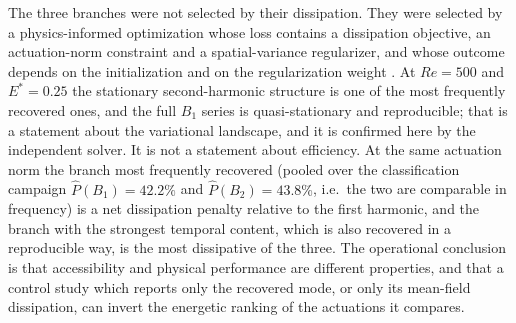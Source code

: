 \documentclass[11pt,a4paper]{article}
\newenvironment{chgadd}{\par\color{blue}}{\par\color{black}}
\begin{document}
\begin{chgadd}
The three branches were not selected by their dissipation. They were selected by a
physics-informed optimization whose loss contains a dissipation objective, an
actuation-norm constraint and a spatial-variance regularizer, and whose outcome
depends on the initialization and on the regularization weight
\cite{beniaiche2026}. At $Re=500$ and $E^\ast=0.25$ the stationary
second-harmonic structure is one of the most frequently recovered ones, and the full
$B_1$ series is quasi-stationary and reproducible; that is a statement about the
variational landscape, and it is confirmed here by the independent solver. It is
not a statement about efficiency. At the same actuation norm the branch most
frequently recovered (pooled over the classification campaign
$\widehat{P}(B_1)=42.2\%$ and $\widehat{P}(B_2)=43.8\%$, i.e.\ the two are
comparable in frequency) is a net dissipation penalty relative to the first harmonic,
and the branch with the strongest temporal content, which is also recovered in a
reproducible way, is the most dissipative of the three. The operational
conclusion is that accessibility and physical performance are different
properties, and that a control study which reports only the recovered mode, or
only its mean-field dissipation, can invert the energetic ranking of the
actuations it compares.


\end{chgadd}
\end{document}
